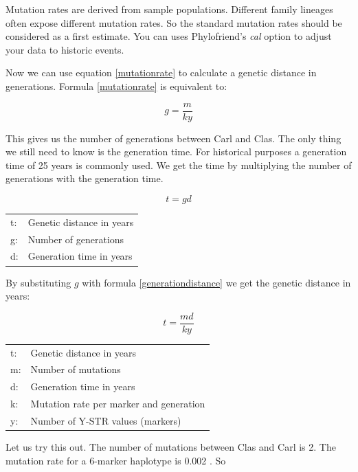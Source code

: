 Mutation rates are derived from sample populations. Different
family lineages often expose different mutation rates. So the
standard mutation rates should be considered as a first 
estimate. You can uses Phylofriend's \emph{cal} option to
adjust your data to historic events.

Now we can use equation \ref{mutationrate} to calculate a
genetic distance in generations. Formula \ref{mutationrate}
is equivalent to:

\begin{equation}
g = \frac{m}{k y} \label{generationdistance}
\end{equation}

This gives us the number of generations between Carl and Clas.
The only thing we still need to know is the generation time.
For historical purposes a generation time of 25 years is
commonly used. We get the time by multiplying the number
of generations with the generation time.

\begin{equation}
t = g d           \label{generationtime}
\end{equation}

\begin{tabular}{ll}
t: &  Genetic distance in years\\
g: &  Number of generations \\
d: &  Generation time in years
\end{tabular}
\vspace{1em}

By substituting $g$ with formula \ref{generationdistance}
we get the genetic distance in years:

\begin{equation}
t = \frac{m d}{k y} \label{timedistance}
\end{equation}

\begin{tabular}{ll}
t: &  Genetic distance in years\\
m: &  Number of mutations \\
d: &  Generation time in years\\
k: &  Mutation rate per marker and generation\\
y: &  Number of Y-STR values (markers)
\end{tabular}
\vspace{1em}

Let us try this out. The number of mutations between Clas
and Carl is 2. The mutation rate for a 6-marker haplotype
is 0.002 \cite{Kly09}. So

